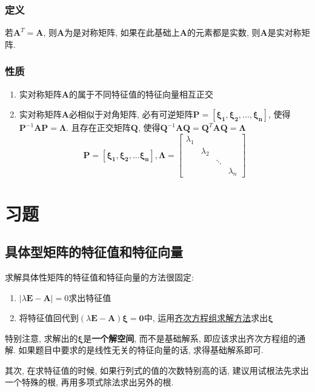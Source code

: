 \subsubsection{定义}
若$ \bm{A}^T = \bm{A} $, 则$ \bm{A} $为是对称矩阵, 如果在此基础上$ \bm{A} $的元素都是实数, 则$ \bm{A} $是实对称矩阵.
\subsubsection{性质}
\begin{enumerate}\label{ref:实对称矩阵}
\item 实对称矩阵$ \bm{A} $的属于不同特征值的特征向量相互正交
\item 实对称矩阵$ \bm{A} $必相似于对角矩阵, 必有可逆矩阵$ \bm{P}=\left[ \bm{\xi_{1}}, \bm{\xi_{2}},... ,\bm{\xi_{n}}\right] $, 使得$ \bm{P}^{-1}\bm{A}\bm{P}=\bm{\Lambda} $. 且存在正交矩阵$ \bm{Q} $, 使得$ \bm{Q}^{-1}\bm{A}\bm{Q}=\bm{Q}^{T}\bm{A}\bm{Q}=\bm{\Lambda}$
\[ \bm{P}=\left[\bm{\xi_1}, \bm{\xi_2},... \bm{\xi_n}\right], \bm{\Lambda} =
\begin{bmatrix}
\lambda_1 &  &  &  \\
& \lambda_2 &  &  \\
&  & \ddots &  \\
&  &  & \lambda_n
\end{bmatrix}
\]
\end{enumerate}
\section{习题}
\subsection{具体型矩阵的特征值和特征向量}
求解具体性矩阵的特征值和特征向量的方法很固定:
\begin{enumerate}
\item $ |\lambda \bm{E}-\bm{A}|=0 $求出特征值
\item 将特征值回代到$ (\lambda \bm{E}-\bm{A})\bm{\xi}=\bm{0} $中, 运用\hyperref[齐次方程组求解方法]{齐次方程组求解方法}求出$ \bm{\xi} $
\end{enumerate}\par
特别注意, 求解出的$ \bm{\xi} $是\textbf{一个解空间}, 而不是基础解系, 即应该求出齐次方程组的通解. 如果题目中要求的是线性无关的特征向量的话, 求得基础解系即可. \par 其次, 在求特征值的时候, 如果行列式的值的次数特别高的话, 建议用试根法先求出一个特殊的根, 再用多项式除法求出另外的根.
